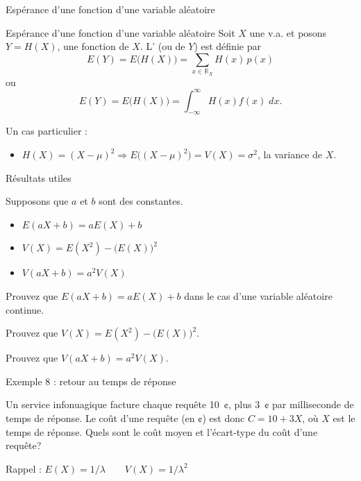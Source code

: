 \documentclass{BeamerTemplate}
\newcommand{\cibleReponse}{}
\newcommand{\lienreponse}[1]{\gdef\cibleReponse{#1}}
\begin{document}
\begin{frame}[t]{Espérance d'une fonction d'une variable aléatoire}

{\small
\begin{Boite}{Espérance d'une fonction d'une variable aléatoire}
 Soit $X$ une v.a. et posons $Y=H(X)$, une fonction
 de $X$. L' (ou de $Y$) est définie par
 $$E(Y)=E\bigl(H(X)\bigr)=\sum_{x\in\mathbb{R}_X}H(x)\,p(x)$$
 ou
 $$E(Y)=E\bigl(H(X)\bigr)=\int_{-\infty}^\infty H(x)f(x)\;dx.$$
\end{Boite}
Un cas particulier :
\begin{itemize}
 \item $H(X)=(X-\mu)^2\Rightarrow E\bigl((X-\mu)^2\bigr)=V(X)=\sigma^2$, la variance de $X$.
\end{itemize}
}
\end{frame}

\begin{frame}[t]{Résultats utiles}

Supposons que $a$ et $b$ sont des constantes.

\begin{itemize}
\item<1-> $E(aX+b)=aE(X)+b$\ \ \ \ \

\vspace{0.45in}

\item<1-> $V(X)=E(X^2)-\bigl(E(X)\bigr)^2$\ \ \ \ \

\vspace{0.75in}

\item<1-> $V(aX+b)=a^2V(X)$\ \ \ \ \
\end{itemize}
\end{frame}

\begin{frame}[t,label=preuve1]
Prouvez que $E(aX+b)=aE(X)+b$ dans le cas d'une variable aléatoire continue.
\lienreponse{rep-ex2}
\end{frame}

\begin{frame}[t]
Prouvez que $V(X)=E(X^2)-\bigl(E(X)\bigr)^2$.
\lienreponse{rep-ex2}
\end{frame}

\begin{frame}[t]
Prouvez que $V(aX+b)=a^2V(X)$.
\lienreponse{rep-ex2}
\end{frame}

\begin{frame}[t,label=ex8]{Exemple 8 : retour au temps de réponse}

Un service infonuagique facture chaque requête 10~¢, plus 3~¢ par milliseconde de temps de réponse.
Le coût d'une requête (en ¢) est donc $C=10+3X$, où $X$ est le temps de réponse.
Quels sont le coût moyen et l'écart-type du coût d'une requête?

Rappel : $E(X)=1/\lambda\qquad V(X)=1/\lambda^2$
\lienreponse{rep-ex2}
\end{frame}
\end{document}
